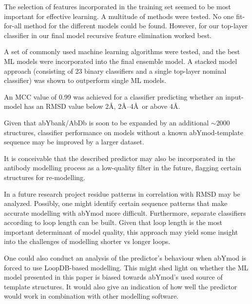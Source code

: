 \documentclass[12pt]{article}
\begin{document}
The selection of features incorporated in the training set seemed to
be most important for effective learning. A multitude of methods were
tested. No one fit-for-all method for the different models could be
found. However, for our top-layer classifier in our final model
recursive feature elimination worked best.

A set of commonly used machine learning algorithms were tested, and
the best ML models were incorporated into the final ensemble model. A
stacked model approach (consisting of 23 binary classifiers and a
single top-layer nominal classifier) was shown to outperform single ML
models.

An MCC value of 0.99 was achieved for a classifier predicting whether
an input-model has an RMSD value below 2\AA, 2\AA--4\AA\ or above
4\AA.

Given that abYbank/AbDb is soon to be expanded by an additional
$\sim$2000 structures, classifier performance on models without a known
abYmod-template sequence may be improved by a larger dataset.

It is conceivable that the described predictor may also be
incorporated in the antibody modelling process as a low-quality filter
in the future, flagging certain structures for re-modelling.

In a future research project residue patterns in correlation with RMSD
may be analyzed. Possibly, one might identify certain sequence
patterns that make accurate modelling with abYmod more
difficult. Furthermore, separate classifiers according to loop length
can be built. Given that loop length is the most important determinant
of model quality, this approach may yield some insight into the
challenges of modelling shorter vs longer loops.

One could also conduct an analysis of the predictor's behaviour when
abYmod is forced to use LoopDB-based modelling. This might shed light
on whether the ML model presented in this paper is biased towards
abYmod's used source of template structures. It would also give an
indication of how well the predictor would work in combination with
other modelling software.


\end{document}
